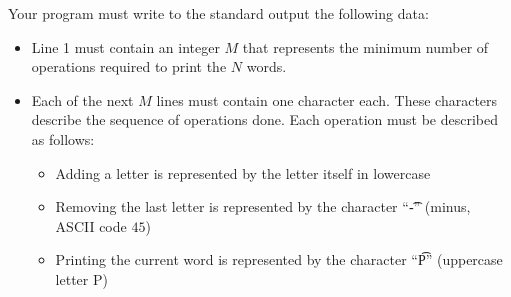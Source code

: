 Your program must write to the standard output the following data:
\begin{itemize}
\item Line 1 must contain an integer $M$ that represents the minimum number of operations required to print the $N$ words.
\item  Each of the next $M$ lines must contain one character each. These characters describe the sequence of operations done. Each operation must be described as follows:
\begin{itemize}
\item Adding a letter is represented by the letter itself in lowercase
\item Removing the last letter is represented by the character ``\t{-}'' (minus, ASCII code $45$)
\item Printing the current word is represented by the character ``\t{P}'' (uppercase letter P)
\end{itemize}
\end{itemize}